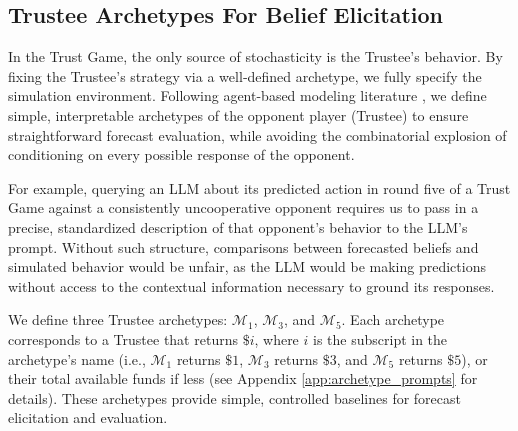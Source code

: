 \documentclass{article} %
\newcommand{\maxoneusd}{$\mathcal{M}_1$\ }
\newcommand{\maxfiveusd}{$\mathcal{M}_5$\ }
\begin{document}

\subsection{Trustee Archetypes For Belief Elicitation}
In the Trust Game, the only source of stochasticity is the Trustee’s behavior. By fixing the Trustee’s strategy via a well‐defined archetype, we fully specify the simulation environment. Following agent-based modeling literature \citep{chopra2024limits}, we define simple, interpretable archetypes of the opponent player (Trustee) to ensure straightforward forecast evaluation, while avoiding the combinatorial explosion of conditioning on every possible response of the opponent.

For example, querying an LLM about its predicted action in round five of a Trust Game against a consistently uncooperative opponent requires us to pass in a precise, standardized description of that opponent's behavior to the LLM's prompt. Without such structure, comparisons between forecasted beliefs and simulated behavior would be unfair, as the LLM would be making predictions without access to the contextual information necessary to ground its responses.

We define three Trustee archetypes: $\mathcal{M}_1$, $\mathcal{M}_3$, and $\mathcal{M}_5$. Each archetype corresponds to a Trustee that returns $\$i$, where $i$ is the subscript in the archetype's name (i.e., $\mathcal{M}_1$ returns $\$1$, $\mathcal{M}_3$ returns $\$3$, and $\mathcal{M}_5$ returns $\$5$), or their total available funds if less (see  Appendix \ref{app:archetype_prompts} for details). These archetypes provide simple, controlled baselines for forecast elicitation and evaluation.

\end{document}
